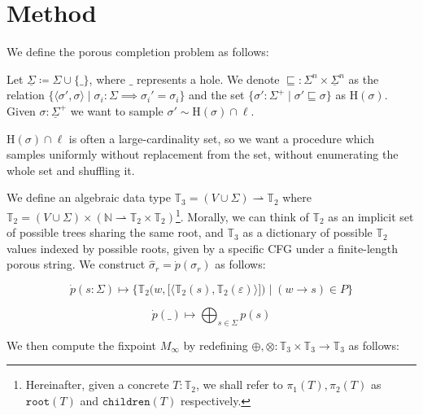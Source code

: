 \documentclass[sigplan,nonacm]{acmart}\settopmatter{printfolios=false,printccs=false,printacmref=false}
\begin{document}
  \pagebreak\section{Method}\label{sec:method}

  We define the porous completion problem as follows:

  \begin{definition}[Completion]
    Let $\underline\Sigma \coloneqq \Sigma \cup \{\_\}$, where $\_$ represents a hole. We denote $\sqsubseteq: \Sigma^n \times \underline\Sigma^n$ as the relation $\{\langle\sigma', \sigma\rangle \mid \sigma_i: \Sigma \implies \sigma_i' = \sigma_i\}$ and the set $\{\sigma': \Sigma^+ \mid \sigma' \sqsubseteq \sigma\}$ as $\text{H}(\sigma)$. Given $\sigma: \underline\Sigma^+$ we want to sample $\sigma' \sim \text{H}(\sigma)\cap\ell$.
  \end{definition}

  $\text{H}(\sigma)\cap\ell$ is often a large-cardinality set, so we want a procedure which samples uniformly without replacement from the set, without enumerating the whole set and shuffling it.

   We define an algebraic data type $\mathbb{T}_3 = (V \cup \Sigma) \rightharpoonup \mathbb{T}_2$ where $\mathbb{T}_2 = (V \cup \Sigma) \times (\mathbb{N} \rightharpoonup \mathbb{T}_2\times\mathbb{T}_2)$\footnote{Hereinafter, given a concrete $T:\mathbb{T}_2$, we shall refer to $\pi_1(T), \pi_2(T)$ as $\texttt{root}(T)$ and $\texttt{children}(T)$ respectively.}. Morally, we can think of $\mathbb{T}_2$ as an implicit set of possible trees sharing the same root, and $\mathbb{T}_3$ as a dictionary of possible $\mathbb{T}_2$ values indexed by possible roots, given by a specific CFG under a finite-length porous string. We construct $\hat\sigma_r = \dot{p}(\sigma_r)$ as follows:

\begin{equation*}
\dot{p}(s: \Sigma) \mapsto \Big\{\mathbb{T}_2\big(w, \big[\langle\mathbb{T}_2(s), \mathbb{T}_2(\varepsilon)\rangle\big]\big) \mid (w \rightarrow s)\in P\Big\}
\end{equation*}

\begin{equation*}
\dot{p}(\_) \mapsto \bigoplus_{s\in \Sigma} p(s)
\end{equation*}

\noindent We then compute the fixpoint $M_\infty$ by redefining $\oplus, \otimes: \mathbb{T}_3 \times \mathbb{T}_3 \rightarrow \mathbb{T}_3$ as follows:
\end{document}
